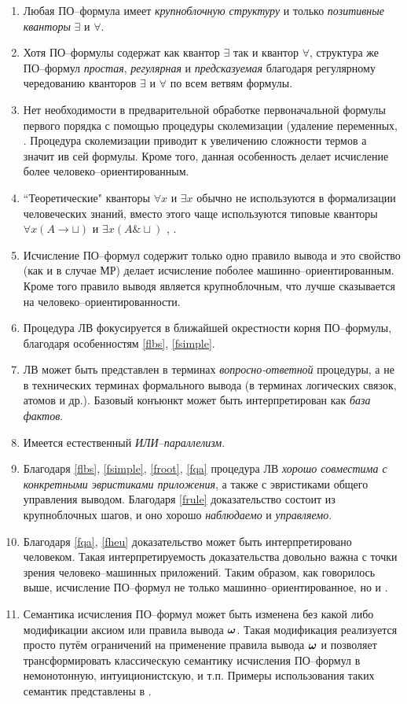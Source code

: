 \begin{enumerate}
\item\label{flbs} Любая ПО--формула имеет {\em крупноблочную структуру} и только {\em позитивные кванторы} $\exists$ и $\forall$.
%
\item\label{fsimple} Хотя ПО--формулы содержат как квантор $\exists$ так и квантор $\forall$, структура же ПО--формул {\em простая}, {\em регулярная} и {\em предсказуемая} благодаря регулярному чередованию кванторов $\exists$ и $\forall$ по всем ветвям формулы.
%
\item Нет необходимости в предварительной обработке первоначальной формулы первого порядка с помощью процедуры сколемизации (удаление переменных, . Процедура сколемизации приводит к увеличению сложности термов а значит ив сей формулы. Кроме того, данная особенность делает исчисление более человеко--ориентированным.
%
\item ``Теоретические" кванторы $\forall x$ и $\exists x$ обычно не используются в формализации человеческих знаний, вместо этого чаще используются типовые кванторы $\forall x(A \rightarrow \sqcup)$ и $\exists x(A \& \sqcup)$ \cite{Bourbaki}, \cite{ICDS2000}.
%
\item\label{frule} Исчисление ПО--формул содержит только одно правило вывода и это свойство (как и в случае МР) делает исчисление поболее машинно--ориентированным. Кроме того правило выводя является крупноблочным, что лучше сказывается на человеко--ориентированности.
%
\item\label{froot} Процедура ЛВ фокусируется в ближайшей окрестности корня ПО--формулы, благодаря особенностям \ref{flbs}, \ref{fsimple}.
%
\item\label{fqa} ЛВ может быть представлен в терминах {\em вопросно-ответной} процедуры, а не в технических терминах формального вывода (в терминах логических связок, атомов и др.). Базовый конъюнкт может быть интерпретирован как {\em база фактов}.
%
\item Имеется естественный {\em ИЛИ--параллелизм}.
%
\item\label{fheu} Благодаря \ref{flbs}, \ref{fsimple}, \ref{froot}, \ref{fqa} процедура ЛВ {\em хорошо совместима с конкретными эвристиками приложения}, а также с эвристиками общего управления выводом. Благодаря \ref{frule} доказательство состоит из крупноблочных шагов, и оно хорошо {\em наблюдаемо} и {\em управляемо}.
%
\item Благодаря \ref{fqa}, \ref{fheu} доказательство может быть интерпретировано человеком. Такая интерпретируемость доказательства довольно важна с точки зрения человеко--машинных приложений. Таким образом, как говорилось выше, исчисление ПО--формул не только машинно--ориентированное, но и .
%
\item Семантика исчисления ПО--формул может быть изменена без какой либо модификации аксиом или правила вывода $\boldsymbol{\omega}$. Такая модификация реализуется просто путём ограничений на применение правила вывода $\boldsymbol{\omega}$ и позволяет трансформировать классическую семантику исчисления ПО--формул в немонотонную, интуиционистскую, и т.п. Примеры использования таких семантик представлены в \cite{ICDS2000}.
\end{enumerate}


